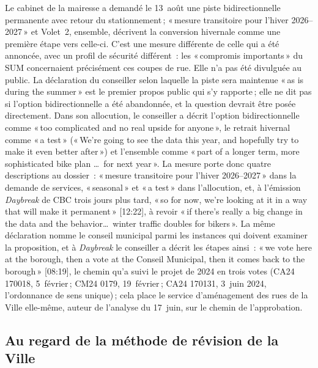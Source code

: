 \documentclass[11pt,letterpaper]{article}
\begin{document}
Le cabinet de la mairesse a demandé le 13~août une piste bidirectionnelle
permanente avec retour du stationnement\,; «\,mesure transitoire pour l'hiver
2026--2027\,» et Volet~2, ensemble, décrivent la conversion hivernale comme
une première étape vers celle-ci. C'est une mesure différente de celle
qui a été annoncée, avec un profil de sécurité différent~: les «\,compromis
importants\,» du SUM concernaient précisément ces coupes de rue. Elle n'a
pas été divulguée au public. La déclaration du conseiller selon laquelle la
piste sera maintenue «\,as is during the summer\,» est le premier propos
public qui s'y rapporte\,; elle ne dit pas si l'option bidirectionnelle a
été abandonnée, et la question devrait être posée directement. Dans son
allocution, le conseiller a décrit l'option bidirectionnelle comme «\,too
complicated and no real upside for anyone\,», le retrait hivernal comme
«\,a test\,» («\,We're going to see the data this year, and hopefully try to
make it even better after\,») et l'ensemble comme «\,part of a longer term,
more sophisticated bike plan \ldots\ for next year\,». La mesure porte donc
quatre descriptions au dossier~: «\,mesure transitoire pour l'hiver
2026--2027\,» dans la demande de services, «\,seasonal\,» et «\,a test\,»
dans l'allocution, et, à l'émission \emph{Daybreak} de CBC trois jours plus
tard, «\,so for now, we're looking at it in a way that will make it
permanent\,» [12:22], à revoir «\,if there's really a big change in the data
and the behavior\ldots\ winter traffic doubles for bikers\,». La même
déclaration nomme le conseil municipal parmi les instances qui doivent
examiner la proposition, et à \emph{Daybreak} le conseiller a décrit les
étapes ainsi~: «\,we vote here at the borough, then a vote at the Conseil
Municipal, then it comes back to the borough\,» [08:19], le chemin qu'a
suivi le projet de 2024 en trois votes (CA24 170018, 5~février\,; CM24 0179,
19~février\,; CA24 170131, 3~juin 2024, l'ordonnance de sens unique)\,; cela
place le service d'aménagement des rues de la Ville elle-même, auteur de
l'analyse du 17~juin, sur le chemin de l'approbation.

\subsection{Au regard de la méthode de révision de la Ville}
\end{document}
